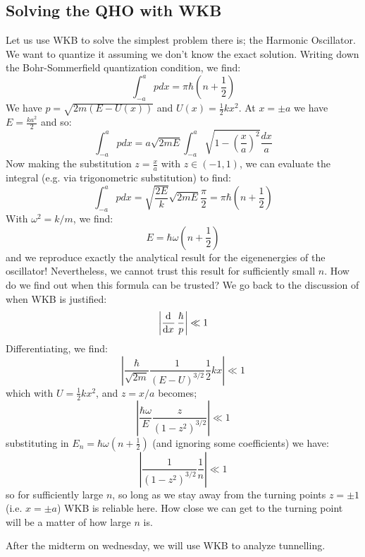 \subsection{Solving the QHO with WKB}
Let us use WKB to solve the simplest problem there is; the Harmonic Oscillator. We want to quantize it assuming we don't know the exact solution. Writing down the Bohr-Sommerfield quantization condition, we find:
\begin{equation}
    \int_{-a}^a pdx = \pi\hbar(n + \frac{1}{2})
\end{equation}
We have $p = \sqrt{2m(E - U(x))}$ and $U(x) = \frac{1}{2}kx^2$. At $x = \pm a$ we have $E = \frac{ka^2}{2}$ and so:
\begin{equation}
    \int_{-a}^{a} pdx = a\sqrt{2mE}\int_{-a}^{a}\sqrt{1 - \left(\frac{x}{a}\right)^2}\frac{dx}{a}
\end{equation}
Now making the substitution $z = \frac{x}{a}$ with $z \in (-1, 1)$, we can evaluate the integral (e.g. via trigonometric substitution) to find:
\begin{equation}
    \int_{-a}^{a} pdx  = \sqrt{\frac{2E}{k}}\sqrt{2mE}\frac{\pi}{2} = \pi\hbar(n + \frac{1}{2})
\end{equation}
With $\omega^2 = k/m$, we find:
\begin{equation}
    E = \hbar\omega(n + \frac{1}{2})
\end{equation}
and we reproduce exactly the analytical result for the eigenenergies of the oscillator! Nevertheless, we cannot trust this result for sufficiently small $n$. How do we find out when this formula can be trusted? We go back to the discussion of when WKB is justified:
\begin{equation}
    \left|\dod{}{x}\frac{\hbar}{p}\right| \ll 1
\end{equation}
Differentiating, we find:
\begin{equation}
    \left|\frac{\hbar}{\sqrt{2m}}\frac{1}{(E - U)^{3/2}}\frac{1}{2}kx\right| \ll 1
\end{equation}
which with $U = \frac{1}{2}kx^2$, and $z = x/a$ becomes;
\begin{equation}
    \left| \frac{\hbar\omega}{E}\frac{z}{(1-z^2)^{3/2}}\right| \ll 1
\end{equation}
substituting in $E_n = \hbar\omega(n + \frac{1}{2})$ (and ignoring some coefficients) we have:
\begin{equation}
    \left|\frac{1}{(1-z^2)^{3/2}}\frac{1}{n}\right| \ll 1
\end{equation}
so for sufficiently large $n$, so long as we stay away from the turning points $z = \pm 1$ (i.e. $x = \pm a$) WKB is reliable here. How close we can get to the turning point will be a matter of how large $n$ is.

After the midterm on wednesday, we will use WKB to analyze tunnelling.